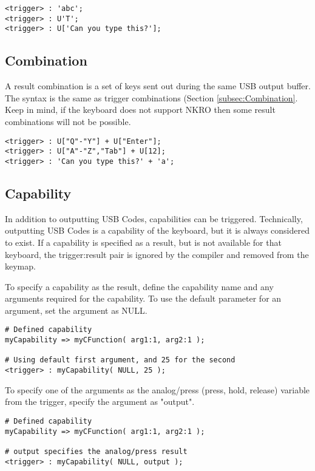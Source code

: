 \documentclass{kiibohd-template}
\begin{document}
\begin{lstlisting}
<trigger> : 'abc';
<trigger> : U'T';
<trigger> : U['Can you type this?'];
\end{lstlisting}


\subsection{Combination}

A result combination is a set of keys sent out during the same USB output buffer.
The syntax is the same as trigger combinations (Section \ref{subsec:Combination}.
Keep in mind, if the keyboard does not support NKRO then some result combinations will not be possible.

\begin{lstlisting}
<trigger> : U["Q"-"Y"] + U["Enter"];
<trigger> : U["A"-"Z","Tab"] + U[12];
<trigger> : 'Can you type this?' + 'a';
\end{lstlisting}


\subsection{Capability}

In addition to outputting USB Codes, capabilities can be triggered.
Technically, outputting USB Codes is a capability of the keyboard, but it is always considered to exist.
If a capability is specified as a result, but is not available for that keyboard, the trigger:result pair is ignored by the compiler and removed from the keymap.

To specify a capability as the result, define the capability name and any arguments required for the capability.
To use the default parameter for an argument, set the argument as NULL.

\begin{lstlisting}
# Defined capability
myCapability => myCFunction( arg1:1, arg2:1 );

# Using default first argument, and 25 for the second
<trigger> : myCapability( NULL, 25 );
\end{lstlisting}

To specify one of the arguments as the analog/press (press, hold, release) variable from the trigger, specify the argument as "output".

\begin{lstlisting}
# Defined capability
myCapability => myCFunction( arg1:1, arg2:1 );

# output specifies the analog/press result
<trigger> : myCapability( NULL, output );
\end{lstlisting}
\end{document}
